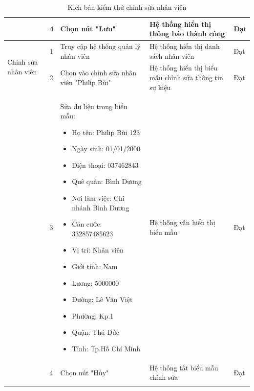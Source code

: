 {\begin{longtable}{| p{2.5cm}| p{1cm}| p{5.5cm}| p{4.5cm} | p{1.5cm} |}
        \cline{2-5}
                                                    & 4                              & Chọn nút "Lưu"                            & Hệ thống hiển thị thông báo thành công                 & Đạt             \\
        \hline
        \multirow[t]{2}{2.5cm}{Chỉnh sửa nhân viên} & 1                              & Truy cập hệ thống quản lý nhân viên       & Hệ thống hiển thị danh sách nhân viên                  & Đạt             \\
        \cline{2-5}
                                                    & 2                              & Chọn vào chỉnh sửa nhân viên "Philip Bùi" & Hệ thống hiển thị biểu mẫu chỉnh sửa thông tin sự kiệu & Đạt             \\
        \cline{2-5}
                                                    & 3                              & Sửa dữ liệu trong biểu mẫu:
        \begin{itemize}
            \item Họ tên: Philip Bùi 123
            \item Ngày sinh: 01/01/2000
            \item Điện thoại: 037462843
            \item Quê quán: Bình Dương
            \item Nơi làm việc: Chi nhánh Bình Dương
            \item Căn cước: 332857485623
            \item Vị trí: Nhân viên
            \item Giới tính: Nam
            \item Lương: 5000000
            \item Đường: Lê Văn Việt
            \item Phường: Kp.1
            \item Quận: Thủ Đức
            \item Tỉnh: Tp.Hồ Chí Minh
        \end{itemize}    & Hệ thống vẫn hiển thị biểu mẫu & Đạt                                                                                                                                             \\
        \cline{2-5}
                                                    & 4                              & Chọn nút "Hủy"                            & Hệ thống tắt biểu mẫu chỉnh sửa                        & Đạt             \\
        \hline
        \caption{Kịch bản kiểm thử chỉnh sửa nhân viên}
    \end{longtable}
}

